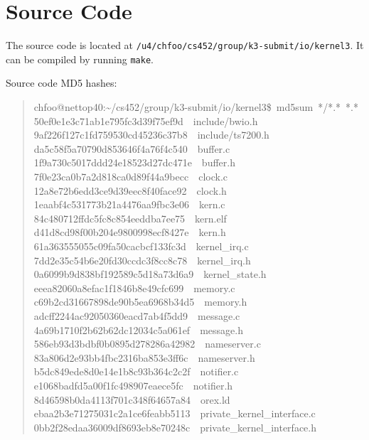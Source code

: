 \documentclass[letterpaper]{article}
\begin{document}
\section{Source Code%
  \label{source-code}%
}

The source code is located at \texttt{/u4/chfoo/cs452/group/k3-submit/io/kernel3}. It can be compiled by running \texttt{make}.

Source code MD5 hashes:
%
\begin{quote}{\ttfamily \raggedright \noindent
chfoo@nettop40:\textasciitilde{}/cs452/group/k3-submit/io/kernel3\$~md5sum~*/*.*~*.*\\
50ef0e1e3c71ab1e795fc3d39f75ef9d~~include/bwio.h\\
9af226f127c1fd759530cd45236c37b8~~include/ts7200.h\\
da5c58f5a70790d853646f4a76f4c540~~buffer.c\\
1f9a730c5017ddd24e18523d27dc471e~~buffer.h\\
7f0e23ca0b7a2d818ca0d89f44a9becc~~clock.c\\
12a8e72b6edd3ce9d39eec8f40face92~~clock.h\\
1eaabf4c531773b21a4476aa9fbc3e06~~kern.c\\
84c480712ffdc5fc8c854eeddba7ee75~~kern.elf\\
d41d8cd98f00b204e9800998ecf8427e~~kern.h\\
61a363555055c09fa50cacbcf133fc3d~~kernel\_irq.c\\
7dd2e35c54b6e20fd30ccdc3f8cc8c78~~kernel\_irq.h\\
0a6099b9d838bf192589c5d18a73d6a9~~kernel\_state.h\\
eeea82060a8efac1f1846b8e49cfc699~~memory.c\\
c69b2cd31667898de90b5ea6968b34d5~~memory.h\\
adcff2244ac92050360eacd7ab4f5dd9~~message.c\\
4a69b1710f2b62b62dc12034c5a061ef~~message.h\\
586eb93d3bdbf0b0895d278286a42982~~nameserver.c\\
83a806d2e93bb4fbc2316ba853e3ff6c~~nameserver.h\\
b5dc849ede8d0e14e1b8c93b364c2c2f~~notifier.c\\
e1068badfd5a00f1fc498907eaece5fc~~notifier.h\\
8d46598b0da4113f701c348f64657a84~~orex.ld\\
ebaa2b3e71275031c2a1ce6feabb5113~~private\_kernel\_interface.c\\
0bb2f28edaa36009df8693eb8e70248c~~private\_kernel\_interface.h\\
}
\end{quote}
\end{document}
